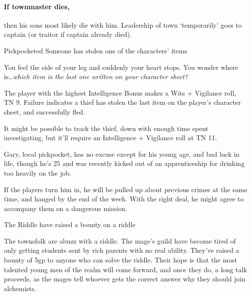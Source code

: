 \begin{multicols}{2}
\paragraph{If \gls{townmaster} dies,}
then his sons most likely die with him.
Leadership of \gls{town} `temporarily' goes to \Gls{captain} (or \gls{traitor} if \gls{captain} already died).

\stopcontents[sq]

\label{randommeetings}

\startcontents[sq]

\sqminitoc

{Pickpocketed}%
{Someone has stolen one of the characters' items}%

\begin{boxtext}

  You feel the side of your leg and suddenly your heart stops.
  You wonder where is\ldots \textit{which item is the last one written on your character sheet?}

\end{boxtext}

The player with the highest Intelligence Bonus makes a Wits + Vigilance roll, TN 9.
Failure indicates a thief has stolen the last item on the player's character sheet, and successfully fled.

It might be possible to track the thief, down with enough time spent investigating, but it'll require an Intelligence + Vigilance roll at TN 11.

Gary, local pickpocket, has no excuse except for his young age, and bad luck in life, though he's 25 and was recently kicked out of an apprenticeship for drinking too heavily on the job.

If the players turn him in, he will be pulled up about previous crimes at the same time, and hanged by the end of the week.
With the right deal, he might agree to accompany them on a dangerous mission.


{The Riddle}%
{ have raised a bounty on a riddle}%

The townsfolk are abuzz with a riddle.
The mage's guild have become tired of only getting students sent by rich parents with no real ability.
They've raised a bounty of 5gp to anyone who can solve the riddle.
Their hope is that the most talented young men of the realm will come forward, and once they do, a long talk proceeds, as the mages tell whoever gets the correct answer why they should join \gls{alchemists}.


\end{multicols}
